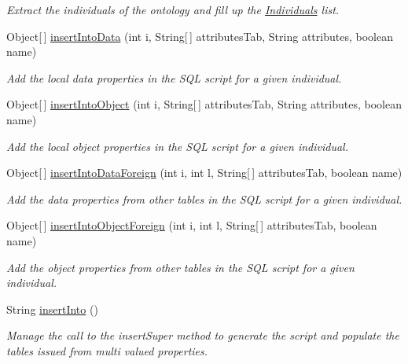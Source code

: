 \begin{DoxyCompactItemize}
\begin{DoxyCompactList}\small\item\em Extract the individuals of the ontology and fill up the \hyperlink{class_data_base_1_1_individuals}{Individuals} list. \end{DoxyCompactList}\item 
Object\mbox{[}$\,$\mbox{]} \hyperlink{class_data_base_1_1_individuals_a761be644890ab4df91f25737b14c47e1}{insertIntoData} (int i, String\mbox{[}$\,$\mbox{]} attributesTab, String attributes, boolean name)
\begin{DoxyCompactList}\small\item\em Add the local data properties in the SQL script for a given individual. \end{DoxyCompactList}\item 
Object\mbox{[}$\,$\mbox{]} \hyperlink{class_data_base_1_1_individuals_a62c20642b5ec5388807c8764db939ca2}{insertIntoObject} (int i, String\mbox{[}$\,$\mbox{]} attributesTab, String attributes, boolean name)
\begin{DoxyCompactList}\small\item\em Add the local object properties in the SQL script for a given individual. \end{DoxyCompactList}\item 
Object\mbox{[}$\,$\mbox{]} \hyperlink{class_data_base_1_1_individuals_a26f7937c9f5299eae44f22255d348351}{insertIntoDataForeign} (int i, int l, String\mbox{[}$\,$\mbox{]} attributesTab, boolean name)
\begin{DoxyCompactList}\small\item\em Add the data properties from other tables in the SQL script for a given individual. \end{DoxyCompactList}\item 
Object\mbox{[}$\,$\mbox{]} \hyperlink{class_data_base_1_1_individuals_adb00317cfabdd880f85949801da1e3b6}{insertIntoObjectForeign} (int i, int l, String\mbox{[}$\,$\mbox{]} attributesTab, boolean name)
\begin{DoxyCompactList}\small\item\em Add the object properties from other tables in the SQL script for a given individual. \end{DoxyCompactList}\item 
String \hyperlink{class_data_base_1_1_individuals_a7410f8761de398b55a1fc29e3db00e9f}{insertInto} ()
\begin{DoxyCompactList}\small\item\em Manage the call to the insertSuper method to generate the script and populate the tables issued from multi valued properties. \end{DoxyCompactList}\item 

\end{DoxyCompactItemize}
